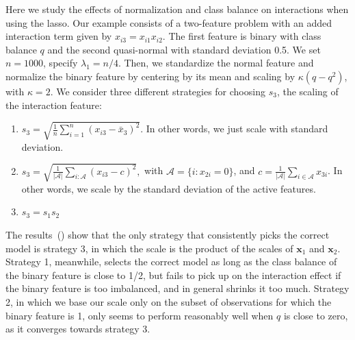 Here we study the effects of normalization and class balance on interactions when using the
lasso. Our example consists of a two-feature problem with an added interaction term given
by \(x_{i3} = x_{i1}x_{i2}\). The first feature is binary with class balance \(q\) and the
second quasi-normal with standard deviation 0.5. We set \(n=1000\), specify \(\lambda_1 =
n/4\). Then, we standardize the normal feature and normalize the binary feature by
centering by its mean and scaling by \(\kappa (q - q^2)\), with \(\kappa = 2\). We consider
three different strategies for choosing \(s_3\), the scaling of the interaction feature:
\begin{enumerate}
  \item \(s_3 = \sqrt{\frac{1}{n}\sum_{i=1}^n (x_{i3} - \bar{x}_3)^2}\). In other words, we just scale with standard deviation.
  \item \(s_3 = \sqrt{\frac{1}{|\mathcal{A}|}\sum_{i :\mathcal{A}} (x_{i3} - c)^2},\)
        with \(\mathcal{A} = \{i : x_{2i} = 0\}\), and \(c = \frac{1}{|\mathcal{A}|} \sum_{i \in \mathcal{A}} x_{3i}\).
        In other words, we scale by the standard deviation of the active features.
  \item \(s_3 = s_1s_2\)
\end{enumerate}

The results~() show that the only strategy that consistently picks
the correct model is strategy 3, in which the scale is the product of the scales of
\(\bm{x}_1\) and \(\bm{x}_2\). Strategy 1, meanwhile, selects the correct model as long as
the class balance of the binary feature is close to 1/2, but fails to pick up on the
interaction effect if the binary feature is too imbalanced, and in general shrinks it too
much. Strategy 2, in which we base our scale only on the subset of observations for which
the binary feature is 1, only seems to perform reasonably well when \(q\) is close to zero,
as it converges towards strategy 3.


